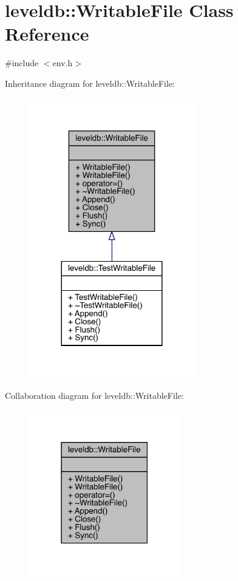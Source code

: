 \hypertarget{classleveldb_1_1_writable_file}{}\section{leveldb\+::Writable\+File Class Reference}
\label{classleveldb_1_1_writable_file}


{\ttfamily \#include $<$env.\+h$>$}



Inheritance diagram for leveldb\+::Writable\+File\+:
\nopagebreak
\begin{figure}[H]
\begin{center}
\leavevmode
\includegraphics[width=204pt]{classleveldb_1_1_writable_file__inherit__graph}
\end{center}
\end{figure}


Collaboration diagram for leveldb\+::Writable\+File\+:
\nopagebreak
\begin{figure}[H]
\begin{center}
\leavevmode
\includegraphics[width=186pt]{classleveldb_1_1_writable_file__coll__graph}
\end{center}
\end{figure}

